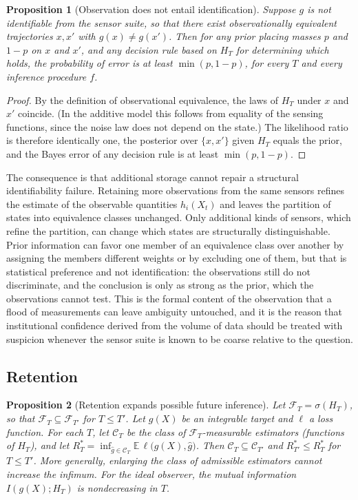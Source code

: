 \documentclass[11pt]{article}
\theoremstyle{plain}
\newtheorem{proposition}{Proposition}
\theoremstyle{definition}
\theoremstyle{remark}
\newcommand{\E}{\mathbb{E}}
\begin{document}
\begin{proposition}[Observation does not entail identification]\label{prop:ident}
Suppose $g$ is not identifiable from the sensor suite, so that there exist observationally equivalent trajectories $x,x'$ with $g(x)\neq g(x')$. Then for any prior placing masses $p$ and $1-p$ on $x$ and $x'$, and any decision rule based on $H_T$ for determining which holds, the probability of error is at least $\min(p,1-p)$, for every $T$ and every inference procedure $f$.
\end{proposition}

\begin{proof}
By the definition of observational equivalence, the laws of $H_T$ under $x$ and $x'$ coincide. (In the additive model this follows from equality of the sensing functions, since the noise law does not depend on the state.) The likelihood ratio is therefore identically one, the posterior over $\{x,x'\}$ given $H_T$ equals the prior, and the Bayes error of any decision rule is at least $\min(p,1-p)$.
\end{proof}

The consequence is that additional storage cannot repair a structural identifiability failure. Retaining more observations from the same sensors refines the estimate of the observable quantities $h_i(X_t)$ and leaves the partition of states into equivalence classes unchanged. Only additional kinds of sensors, which refine the partition, can change which states are structurally distinguishable. Prior information can favor one member of an equivalence class over another by assigning the members different weights or by excluding one of them, but that is statistical preference and not identification: the observations still do not discriminate, and the conclusion is only as strong as the prior, which the observations cannot test. This is the formal content of the observation that a flood of measurements can leave ambiguity untouched, and it is the reason that institutional confidence derived from the volume of data should be treated with suspicion whenever the sensor suite is known to be coarse relative to the question.

\subsection{Retention}

\begin{proposition}[Retention expands possible future inference]\label{prop:retention}
Let $\mathcal{F}_T=\sigma(H_T)$, so that $\mathcal{F}_T\subseteq\mathcal{F}_{T'}$ for $T\leq T'$. Let $g(X)$ be an integrable target and $\ell$ a loss function. For each $T$, let $\mathcal{C}_T$ be the class of $\mathcal{F}_T$-measurable estimators (functions of $H_T$), and let $R_T^*=\inf_{\hat g\in\mathcal{C}_T}\E\,\ell\bigl(g(X),\hat g\bigr)$. Then $\mathcal{C}_T\subseteq\mathcal{C}_{T'}$ and $R^*_{T'}\leq R^*_T$ for $T\leq T'$. More generally, enlarging the class of admissible estimators cannot increase the infimum. For the ideal observer, the mutual information $I(g(X);H_T)$ is nondecreasing in $T$.
\end{proposition}
\end{document}
